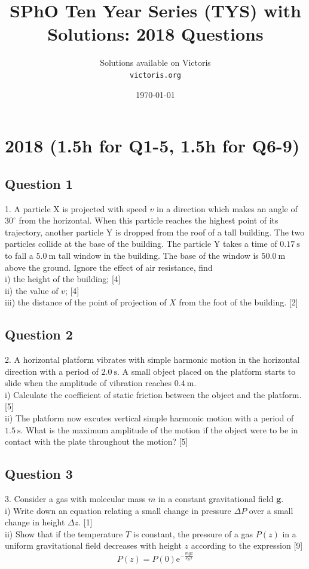 \documentclass{article}
\title{SPhO Ten Year Series (TYS) with Solutions: 2018 Questions}
\author{
    Solutions available on Victoris\\
    \texttt{victoris.org}
}
\date{\today}
\begin{document}
\maketitle

\section{2018 (1.5h for Q1-5, 1.5h for Q6-9)}
\subsection{Question 1}
1. A particle $\mathrm{X}$ is projected with speed $v$ in a direction which makes an angle of $30^{\circ}$ from the horizontal. When this particle reaches the highest point of its trajectory, another particle $\mathrm{Y}$ is dropped from the roof of a tall building. The two particles collide at the base of the building. The particle $\mathrm{Y}$ takes a time of $0.17 \mathrm{~s}$ to fall a $5.0 \mathrm{~m}$ tall window in the building. The base of the window is $50.0 \mathrm{~m}$ above the ground. Ignore the effect of air resistance, find \\
i) the height of the building; [4] \\
ii) the value of $v$; [4] \\
iii) the distance of the point of projection of $X$ from the foot of the building. [2]

\subsection{Question 2}
2. A horizontal platform vibrates with simple harmonic motion in the horizontal direction with a period of $2.0 \mathrm{~s}$. A small object placed on the platform starts to slide when the amplitude of vibration reaches $0.4 \mathrm{~m}$. \\
i) Calculate the coefficient of static friction between the object and the platform. [5] \\
ii) The platform now excutes vertical simple harmonic motion with a period of $1.5 \mathrm{~s}$. What is the maximum amplitude of the motion if the object were to be in contact with the plate throughout the motion? [5]

\subsection{Question 3}
3. Consider a gas with molecular mass $m$ in a constant gravitational field $\mathbf{g}$. \\
i) Write down an equation relating a small change in pressure $\Delta P$ over a small change in height $\Delta z$. [1] \\
ii) Show that if the temperature $T$ is constant, the pressure of a gas $P(z)$ in a uniform gravitational field decreases with height $z$ according to the expression [9]
$$
P(z)=P(0) \mathrm{e}^{-\frac{m g z}{k_{B} T}}
$$
\end{document}
